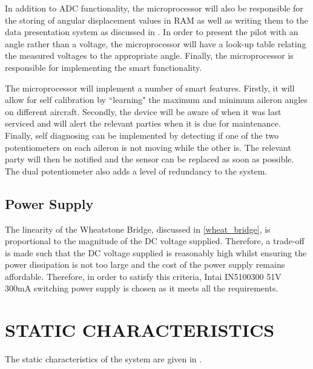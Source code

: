 \documentclass[10pt,twocolumn]{witseiepaper}
\begin{document}
In addition to ADC functionality, the microprocessor will also be responsible for the storing of angular displacement values in RAM as well as writing them to the data presentation system as discussed in . In order to present the pilot with an angle rather than a voltage, the microprocessor will have a look-up table relating the measured voltages to the appropriate angle. Finally, the microprocessor is responsible for implementing the smart functionality.

The microprocessor will implement a number of smart features. Firstly, it will allow for self calibration by ``learning" the maximum and minimum aileron angles on different aircraft. Secondly, the device will be aware of when it was last serviced and will alert the relevant parties when it is due for maintenance. Finally, self diagnosing can be implemented by detecting if one of the two potentiometers on each aileron is not moving while the other is. The relevant party will then be notified and the sensor can be replaced as soon as possible. The dual potentiometer also adds a level of redundancy to the system.  


\subsection{Power Supply} 

The linearity of the Wheatstone Bridge, discussed in \cref{wheat_bridge}, is proportional to the magnitude of the DC voltage supplied. Therefore, a trade-off is made such that the DC voltage supplied is reasonably high whilst ensuring the power dissipation is not too large and the cost of the power supply remains affordable. Therefore, in order to satisfy this criteria, Intai IN5100300 51V 300mA switching power supply \cite{psu} is chosen as it meets all the requirements.

\section{STATIC CHARACTERISTICS}

The static characteristics of the system are given in .
\end{document}
